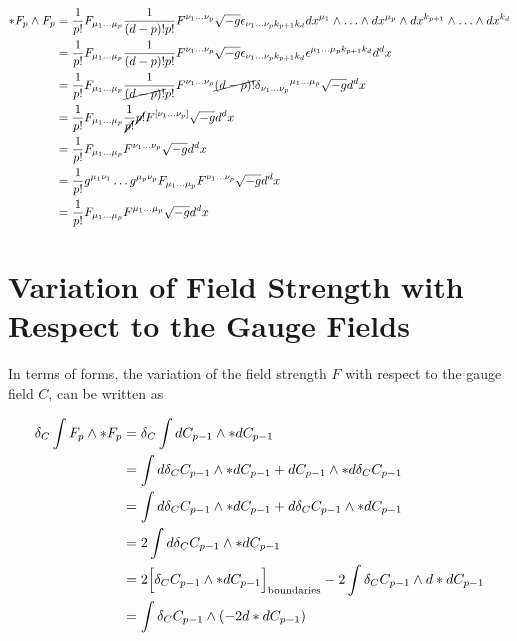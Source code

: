 \documentclass[a4paper,notitlepage]{report}
\begin{document}
\begin{align}
*F_p \wedge F_p &= \frac{1}{p!} F_{\mu_{1} \ldots \mu_{p}} \frac{1}{(d-p)! p!} F^{\nu_{1} \ldots \nu_{p}} \sqrt{-g} \epsilon_{\nu_{1} \ldots \nu_{p} k_{p+1}k_{d}} dx^{{\mu}_1} \wedge \ldots \wedge dx^{{\mu}_p} \wedge dx^{{k}_{p+1}} \wedge \ldots \wedge dx^{{k}_{d}} \notag \\
& = \frac{1}{p!} F_{\mu_{1} \ldots \mu_{p}} \frac{1}{(d-p)! p!} F^{\nu_{1} \ldots \nu_{p}} \sqrt{-g} \epsilon_{\nu_{1} \ldots \nu_{p} k_{p+1}k_{d}} \epsilon^{\mu_{1} \ldots \mu_{p} k_{p+1}k_{d}} d^dx\notag \\
& = \frac{1}{p!} F_{\mu_{1} \ldots \mu_{p}} \frac{1}{\cancel{(d-p)!} p!} F^{\nu_{1} \ldots \nu_{p}} \cancel{(d-p)!} {\delta{_{\nu_{1} \ldots \nu_{p}}}^{\mu_{1} \ldots \mu_{p}}} \sqrt{-g}d^dx\notag \\
& = \frac{1}{p!} F_{\mu_{1} \ldots \mu_{p}} \frac{1}{\cancel{p!}} \cancel{p!} F^{[\nu_{1} \ldots \nu_{p}]} \sqrt{-g}d^dx\notag \\
& = \frac{1}{p!} F_{\mu_{1} \ldots \mu_{p}} F^{\nu_{1} \ldots \nu_{p}} \sqrt{-g}d^dx\notag \\
& = \frac{1}{p!} g^{\mu_{1}\nu_{1}} \ldots g^{\mu_{p}\nu_{p}} F_{\mu_{1} \ldots \mu_{p}} F^{\nu_{1} \ldots \nu_{p}} \sqrt{-g}d^dx \notag \\
&= \frac{1}{p!} F_{\mu_{1} \ldots \mu_{p}} F^{\mu_{1} \ldots \mu_{p}} \sqrt{-g}d^dx \notag \\
\end{align}

\section{Variation of Field Strength with Respect to the Gauge Fields} \label{ABC2}

In terms of forms, the variation of the field strength $F$ with respect to the gauge field $C$, can be written as

\begin{align}
\delta_C \int F_p \wedge *F_p &= \delta_C \int dC_{p-1} \wedge * dC_{p-1} \notag \\
&= \int d\delta_C C_{p-1} \wedge * dC_{p-1} + dC_{p-1} \wedge * d\delta_C C_{p-1} \notag \\
&= \int d\delta_C C_{p-1} \wedge * dC_{p-1} + d \delta_C C_{p-1} \wedge * dC_{p-1} \notag \\
&= 2 \int d\delta_C C_{p-1} \wedge * dC_{p-1} \notag \\
&= 2 \Big[ \delta_C C_{p-1} \wedge * dC_{p-1} \Big]_{\text{boundaries}} - 2 \int \delta_C C_{p-1} \wedge d * dC_{p-1} \notag \\
&= \int \delta_C C_{p-1} \wedge (- 2 d * dC_{p-1})
\end{align}
\end{document}
